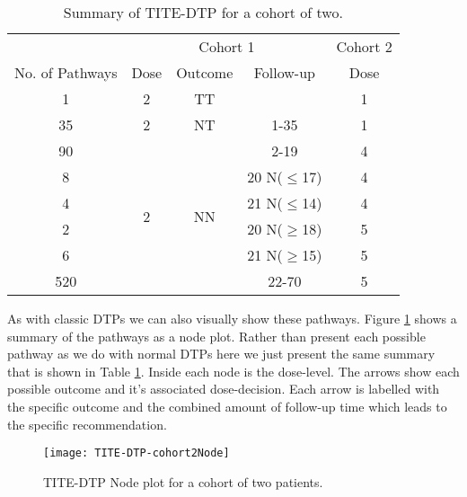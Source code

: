 \begin{table}[H]
	\centering
	\caption{Summary of TITE-DTP for a cohort of two.}
	\label{tab_tite-dtp:TITEDTP_c2_Sum}
	\begin{tabular}{ccccc}
		\hline
		\multicolumn{1}{l}{} &                 \multicolumn{3}{c}{Cohort 1}    & Cohort 2 \\ 
		\cmidrule(l{3pt}r{3pt}){2-4} \cmidrule(l{3pt}r{3pt}){5-5}
		No. of Pathways   & Dose  				& Outcome             & Follow-up 		& Dose     \\ \hline
		1                 & 2               	& TT                  &          		& 1        \\ \hline
		35                & 2            		& NT                  & 1-35      		& 1        \\ \hline
		90   			  & \multirow{6}{*}{2}  & \multirow{6}{*}{NN} & 2-19      		& 4        \\
		8				  &                		&                     & 20 N($\leq$17)  & 4        \\
		4				  &                		&                     & 21 N($\leq$14)  & 4        \\
		2				  &                		&                     & 20 N($\geq$18)  & 5        \\
		6				  &                		&                     & 21 N($\geq$15)  & 5        \\
		520				  &              		&                     & 22-70     		& 5        \\ \hline
	\end{tabular}
\end{table}

As with classic DTPs we can also visually show these pathways. Figure \ref{fig_tite-dtp:TITEDTP-cohort2-node} shows a summary of the pathways as a node plot. Rather than present each possible pathway as we do with normal DTPs here we just present the same summary that is shown in Table \ref{tab_tite-dtp:TITEDTP_c2_Sum}. Inside each node is the dose-level. The arrows show each possible outcome and it's associated dose-decision. Each arrow is labelled with the specific outcome and the combined amount of follow-up time  which leads to the specific recommendation. 

\begin{figure}[h!]
	\centering
	\caption{TITE-DTP Node plot for a cohort of two patients.}
	\label{fig_tite-dtp:TITEDTP-cohort2-node}
	\texttt{[image: TITE-DTP-cohort2Node]}
\end{figure}


